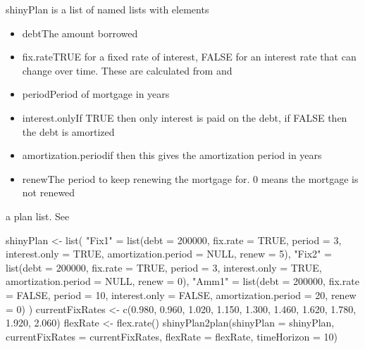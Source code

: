 \documentclass[a4paper]{book}
\begin{document}
%
\begin{Details}\relax
shinyPlan is a list of named lists with elements
\begin{itemize}
 \item debtThe amount borrowed
\item fix.rateTRUE for a fixed rate of interest, FALSE
for an interest rate that can change over time. These are
calculated from  and
 \item periodPeriod of mortgage in
years \item interest.onlyIf TRUE then only interest is
paid on the debt, if FALSE then the debt is amortized
\item amortization.periodif 
then this gives the amortization period in years
\item renewThe period to keep renewing the mortgage
for. 0 means the mortgage is not renewed 
\end{itemize}

\end{Details}
%
\begin{Value}
a plan list. See 
\end{Value}
%
\begin{Examples}
\begin{ExampleCode}
shinyPlan <- list(
   "Fix1" = list(debt = 200000, fix.rate = TRUE, period = 3, interest.only = TRUE, amortization.period = NULL, renew = 5),
   "Fix2" = list(debt = 200000, fix.rate = TRUE, period = 3, interest.only = TRUE, amortization.period = NULL, renew = 0),
   "Amm1" = list(debt = 200000, fix.rate = FALSE, period = 10, interest.only = FALSE, amortization.period = 20, renew = 0)
)
currentFixRates <- c(0.980, 0.960, 1.020, 1.150, 1.300, 1.460, 1.620, 1.780, 1.920, 2.060)
flexRate <- flex.rate()
shinyPlan2plan(shinyPlan = shinyPlan, currentFixRates = currentFixRates,  flexRate = flexRate, timeHorizon = 10)
\end{ExampleCode}
\end{Examples}
\printindex{}
\end{document}
